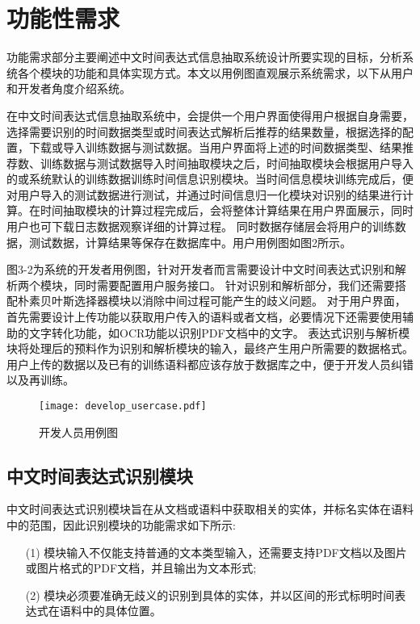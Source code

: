 \section{功能性需求}


功能需求部分主要阐述中文时间表达式信息抽取系统设计所要实现的目标，分析系统各个模块的功能和具体实现方式。本文以用例图直观展示系统需求，以下从用户和开发者角度介绍系统。

在中文时间表达式信息抽取系统中，会提供一个用户界面使得用户根据自身需要，选择需要识别的时间数据类型或时间表达式解析后推荐的结果数量，根据选择的配置，下载或导入训练数据与测试数据。当用户界面将上述的时间数据类型、结果推荐数、训练数据与测试数据导入时间抽取模块之后，时间抽取模块会根据用户导入的或系统默认的训练数据训练时间信息识别模块。当时间信息模块训练完成后，便对用户导入的测试数据进行测试，并通过时间信息归一化模块对识别的结果进行计算。在时间抽取模块的计算过程完成后，会将整体计算结果在用户界面展示，同时用户也可下载日志数据观察详细的计算过程。
同时数据存储层会将用户的训练数据，测试数据，计算结果等保存在数据库中。用户用例图如图2所示。

图3-2为系统的开发者用例图，针对开发者而言需要设计中文时间表达式识别和解析两个模块，同时需要配置用户服务接口。
针对识别和解析部分，我们还需要搭配朴素贝叶斯选择器模块以消除中间过程可能产生的歧义问题。
对于用户界面，首先需要设计上传功能以获取用户传入的语料或者文档，必要情况下还需要使用辅助的文字转化功能，如OCR功能以识别PDF文档中的文字。
表达式识别与解析模块将处理后的预料作为识别和解析模块的输入，最终产生用户所需要的数据格式。
用户上传的数据以及已有的训练语料都应该存放于数据库之中，便于开发人员纠错以及再训练。

\begin{figure}[h]
    \centering
    \texttt{[image: develop\_usercase.pdf]}
    \caption{开发人员用例图}
    \label{fig:develope_usecase}
\end{figure}

\subsection{中文时间表达式识别模块}

中文时间表达式识别模块旨在从文档或语料中获取相关的实体，并标名实体在语料中的范围，因此识别模块的功能需求如下所示:
\begin{enumerate}
    \item[(1)] 模块输入不仅能支持普通的文本类型输入，还需要支持PDF文档以及图片或图片格式的PDF文档，并且输出为文本形式;
    \item[(2)] 模块必须要准确无歧义的识别到具体的实体，并以区间的形式标明时间表达式在语料中的具体位置。
\end{enumerate}

